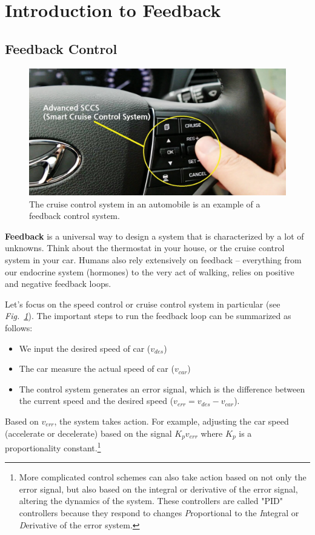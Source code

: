 \section{Introduction to Feedback}
\subsection{Feedback Control}
\begin{figure}[tb]
\centering
\includegraphics[width=.5\columnwidth]{image_0.png}
\caption{The cruise control system in an automobile is an example of a feedback control system.} \label{fig:image_0.png}
\end{figure}
\textbf{Feedback} is a universal way to design a system that is characterized by a lot of unknowns.  Think about the thermostat in your house, or the cruise control system in your car.  Humans also rely extensively on feedback -- everything from our endocrine system (hormones) to the very act of walking, relies on positive and negative feedback loops.  

Let's focus on the speed control or cruise control system in particular (see \emph{Fig.~\ref{fig:image_0.png}}).  The important steps to run the feedback loop can be summarized as follows:
    \begin{itemize}
        \item We input the desired speed of car ($v_{des}$)
        \item The car measure the actual speed of car ($v_{car}$)
        \item The control system generates an error signal, which is the difference between the current speed and the desired speed ($v_{err} = v_{des} - v_{car}$).
    \end{itemize}

Based on $v_{err}$, the system takes action.  For example, adjusting the car speed (accelerate or decelerate) based on the signal $K_p v_{err}$ where $K_p$ is a proportionality constant.\footnote{More complicated control schemes can also take action based on not only the error signal, but also based on the integral or derivative of the error signal, altering the dynamics of the system.  These controllers are called "PID" controllers because they respond to changes \emph{P}roportional to the \emph{I}ntegral or \emph{D}erivative of the error system.}

